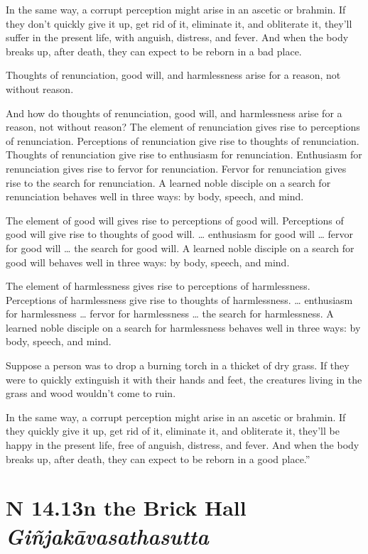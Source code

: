 \documentclass[12pt,openany]{book}%
\newcommand*{\suttatitleacronym}[1]{\smaller[2]{#1}\vspace*{.3em}}
\newcommand*{\suttatitletranslation}[1]{\linebreak{#1}}
\newcommand*{\suttatitleroot}[1]{\linebreak\smaller[2]\itshape{#1}}
\newcommand*{\tocacronym}[1]{\hspace*{-3.3em}{#1}\quad}
\newcommand*{\toctranslation}[1]{#1}
\newcommand*{\tocroot}[1]{(\textit{#1})}
\begin{document}
In the same way, a corrupt perception might arise in an ascetic or brahmin. If they don’t quickly give it up, get rid of it, eliminate it, and obliterate it, they’ll suffer in the present life, with anguish, distress, and fever. And when the body breaks up, after death, they can expect to be reborn in a bad place. 

Thoughts of renunciation, good will, and harmlessness arise for a reason, not without reason. 

And how do thoughts of renunciation, good will, and harmlessness arise for a reason, not without reason? The element of renunciation gives rise to perceptions of renunciation. Perceptions of renunciation give rise to thoughts of renunciation. Thoughts of renunciation give rise to enthusiasm for renunciation. Enthusiasm for renunciation gives rise to fervor for renunciation. Fervor for renunciation gives rise to the search for renunciation. A learned noble disciple on a search for renunciation behaves well in three ways: by body, speech, and mind. 

The element of good will gives rise to perceptions of good will. Perceptions of good will give rise to thoughts of good will. … enthusiasm for good will … fervor for good will … the search for good will. A learned noble disciple on a search for good will behaves well in three ways: by body, speech, and mind. 

The element of harmlessness gives rise to perceptions of harmlessness. Perceptions of harmlessness give rise to thoughts of harmlessness. … enthusiasm for harmlessness … fervor for harmlessness … the search for harmlessness. A learned noble disciple on a search for harmlessness behaves well in three ways: by body, speech, and mind. 

Suppose a person was to drop a burning torch in a thicket of dry grass. If they were to quickly extinguish it with their hands and feet, the creatures living in the grass and wood wouldn’t come to ruin. 

In the same way, a corrupt perception might arise in an ascetic or brahmin. If they quickly give it up, get rid of it, eliminate it, and obliterate it, they’ll be happy in the present life, free of anguish, distress, and fever. And when the body breaks up, after death, they can expect to be reborn in a good place.” 

%
\section*{{\suttatitleacronym SN 14.13}{\suttatitletranslation In the Brick Hall }{\suttatitleroot Giñjakāvasathasutta}}
\addcontentsline{toc}{section}{\tocacronym{SN 14.13} \toctranslation{In the Brick Hall } \tocroot{Giñjakāvasathasutta}}
\end{document}
